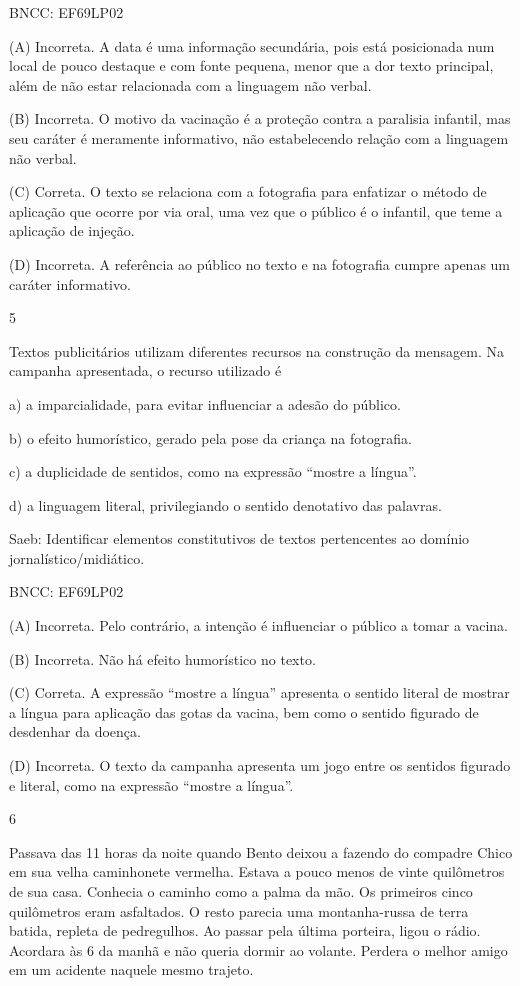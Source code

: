 BNCC: EF69LP02

(A) Incorreta. A data é uma informação secundária, pois está posicionada
num local de pouco destaque e com fonte pequena, menor que a dor texto
principal, além de não estar relacionada com a linguagem não verbal.

(B) Incorreta. O motivo da vacinação é a proteção contra a paralisia
infantil, mas seu caráter é meramente informativo, não estabelecendo
relação com a linguagem não verbal.

(C) Correta. O texto se relaciona com a fotografia para enfatizar o
método de aplicação que ocorre por via oral, uma vez que o público é o
infantil, que teme a aplicação de injeção.

(D) Incorreta. A referência ao público no texto e na fotografia cumpre
apenas um caráter informativo.

\num{5}

Textos publicitários utilizam diferentes recursos na construção da
mensagem. Na campanha apresentada, o recurso utilizado é

a) a imparcialidade, para evitar influenciar a adesão do público.

b) o efeito humorístico, gerado pela pose da criança na fotografia.

c) a duplicidade de sentidos, como na expressão ``mostre a língua''.

d) a linguagem literal, privilegiando o sentido denotativo das palavras.

Saeb: Identificar elementos constitutivos de textos pertencentes ao
domínio jornalístico/midiático.

BNCC: EF69LP02

(A) Incorreta. Pelo contrário, a intenção é influenciar o público a
tomar a vacina.

(B) Incorreta. Não há efeito humorístico no texto.

(C) Correta. A expressão ``mostre a língua'' apresenta o sentido literal
de mostrar a língua para aplicação das gotas da vacina, bem como o
sentido figurado de desdenhar da doença.

(D) Incorreta. O texto da campanha apresenta um jogo entre os sentidos
figurado e literal, como na expressão ``mostre a língua''.

\num{6}

Passava das 11 horas da noite quando Bento deixou a fazendo do compadre
Chico em sua velha caminhonete vermelha. Estava a pouco menos de vinte
quilômetros de sua casa. Conhecia o caminho como a palma da mão. Os
primeiros cinco quilômetros eram asfaltados. O resto parecia uma
montanha-russa de terra batida, repleta de pedregulhos. Ao passar pela
última porteira, ligou o rádio. Acordara às 6 da manhã e não queria
dormir ao volante. Perdera o melhor amigo em um acidente naquele mesmo
trajeto.

